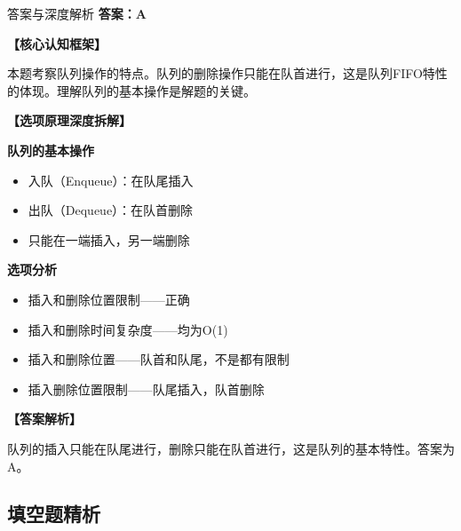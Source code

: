 \documentclass[12pt, a4paper]{article}
\newenvironment{bluebox}{\begin{framed}\begin{minipage}{\linewidth}}{\end{minipage}\end{framed}}
\begin{document}
\begin{bluebox}{答案与深度解析}
	\textbf{答案：A}

	\textbf{【核心认知框架】}

	本题考察队列操作的特点。队列的删除操作只能在队首进行，这是队列FIFO特性的体现。理解队列的基本操作是解题的关键。

	\textbf{【选项原理深度拆解】}

	\item \textbf{队列的基本操作}
	\begin{itemize}
		\item 入队（Enqueue）：在队尾插入
		\item 出队（Dequeue）：在队首删除
		\item 只能在一端插入，另一端删除
	\end{itemize}

	\item \textbf{选项分析}
	\begin{itemize}
		\item[A.] 插入和删除位置限制——正确
		\item[B.] 插入和删除时间复杂度——均为O(1)
		\item[C.] 插入和删除位置——队首和队尾，不是都有限制
		\item[D.] 插入删除位置限制——队尾插入，队首删除
	\end{itemize}

	\textbf{【答案解析】}

	队列的插入只能在队尾进行，删除只能在队首进行，这是队列的基本特性。答案为A。
\end{bluebox}

\subsection{填空题精析}
\end{document}

